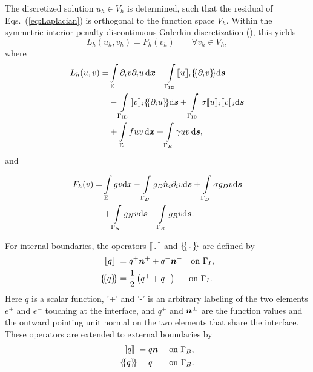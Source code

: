 The discretized solution $u_h\in V_h$ is determined, such that
  the residual of Eqs.~(\ref{eq:Laplacian}) is orthogonal to the function
  space $V_h$.  Within the symmetric interior penalty
  discontinuous Galerkin discretization (\citet*{arnold.d;brezzi.f;cockburn.b;marini.l2002,di2011mathematical}), this yields
%  
\begin{equation}
  L_h(u_h,v_h) = F_h(v_h) \qquad  \forall v_h \in V_h,
\end{equation}
%
where
%
\begin{align} 
  \label{eq:lh}
 \nonumber
 L_h(u,v)
 =&
 \int\displaylimits_{\mathbb{E}}  \partial_i v\partial_i u \,\mathrm{d}\tv{x}
 - \int\displaylimits_{\Gamma_{\rm ID}} \llbracket u \rrbracket_i \dgal*{\partial_i v}\mathrm{d}\tv s \\ \nonumber
 &
 - \int\displaylimits_{\Gamma_{\rm ID}} \llbracket v \rrbracket_i \dgal*{\partial_i u} \mathrm{d}\tv s
+\int\displaylimits_{\Gamma_{\rm ID}}\sigma \llbracket u \rrbracket_i \llbracket v \rrbracket_i \mathrm{d}\tv s  \\
&
+ \int\displaylimits_{\mathbb{E}} f u v \,\mathrm{d}\tv{x} + \int\displaylimits_{\Gamma_R} \gamma u v \,\mathrm{d}\tv s ,
\end{align}
%
and

% 
\begin{align}
  \label{equationFh}
\nonumber
F_h(v) =&
\int\displaylimits_\mathbb{E} gv \mathrm{d}x
- \int\displaylimits_{\Gamma_D}g_D \hat n_i \partial_i v \mathrm{d}\boldsymbol{s} + \int\displaylimits_{\Gamma_D}\sigma g_D v \mathrm{d}\boldsymbol{s} \\
&+ \int\displaylimits_{\Gamma_N}g_Nv\mathrm{d}\boldsymbol{s} -  \int\displaylimits_{\Gamma_{R}}g_Rv \mathrm{d}\boldsymbol{s}.
\end{align}
%

For internal boundaries, the operators $\llbracket\,.\, \rrbracket$ and $\dgal*{\,.\,}$ are
 defined by
\begin{align}
\label{eq:20}
  \llbracket q \rrbracket\; &= q^{+}\tv n^{+} + q^{-}\tv n^{-} \quad\mbox{on $\Gamma_I$}, \\
  \dgal*{q} &= \frac{1}{2}\left( q^{+} + q^{-}\right) \quad\;\;\mbox{on $\Gamma_I$}.
\end{align}
%
Here $q$ is a scalar function, '+' and '-' is an arbitrary labeling of the two elements $e^+$ and $e^-$ touching at the interface, and 
$q^\pm$ and $\boldsymbol{n}^\pm$ are the function values and the outward
pointing unit normal on the two elements that share the
interface. These operators are extended to external boundaries by
%
\begin{align}
  \llbracket q\rrbracket\; &= q\tv n\quad\;\mbox{on $\Gamma_B$},\\
  \dgal*{q} &= q\quad\;\;\;\,\mbox{on $\Gamma_B$}.
\end{align}


